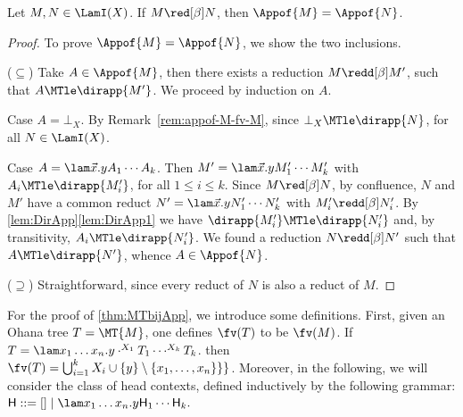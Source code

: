 \begin{proposition}
	Let $M,N\in\LamI(X)$. If $M\red[\beta] N$, then $\Appof{M} = \Appof{N}$.
\end{proposition}

	\begin{proof}
	To prove $\Appof{M} = \Appof{N}$, we show the two inclusions.
	
	($\subseteq$)
	Take $A\in\Appof{M}$, then there exists a reduction $M\redd[\beta] M'$, 
	such that $A\MTle\dirapp{M'}$. We proceed by induction on $A$.
	
	Case $A = \bot_X$. By Remark~\ref{rem:appof-M-fv-M}, since $\bot_X\MTle 
	\dirapp{N}$, for all $N\in\LamI(X)$.
	
	Case $A = \lam\vec x.yA_1\cdots A_k$. 
	Then $M' = \lam\vec x.yM'_1\cdots M'_k$ with $A_i\MTle\dirapp{M'_i}$, 
	for all $1\le i \le k$.
	Since $M\red[\beta] N$, by confluence, $N$ and $M'$ have a common reduct 
	$N' = \lam\vec x.yN'_1\cdots N'_k$ with $M'_i\redd[\beta] N'_i$. By 
	\cref{lem:DirApp}\eqref{lem:DirApp1} we have 
	$\dirapp{M'_i}\MTle\dirapp{N'_i}$ and, by transitivity, 
	$A_i\MTle\dirapp{N'_i}$.
	We found a reduction $N\redd[\beta] N'$ such that $A\MTle \dirapp{N'}$, 
	whence $A\in\Appof{N}$.
	
	($\supseteq$) Straightforward, since every reduct of $N$ is also a 
	reduct of $M$.
	\end{proof}


For the proof of \cref{thm:MTbijApp}, we introduce some definitions.
First, given an Ohana tree $T = \MT{M}$, one defines
$\fv(T)$ to be $\fv(M)$.
If 
$T=\lam x_1\ldots x_n.y\cdot^{X_1}T_1\cdots^{X_k}T_k$.
then $\fv(T) = \bigcup_{i=1}^k X_i \cup \{y\} \setminus \{x_1,\dots,x_n\}\}\}$.
Moreover, in the following, we will consider the class of head contexts, defined inductively by the following grammar:
${\sf H} ::= [] \mid \lam x_1\ldots x_n.y{\sf H}_1\cdots {\sf H}_k.$



